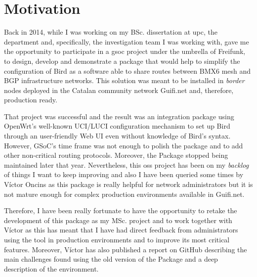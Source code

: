 
\section{Motivation}
\label{sec:motivation}
Back in 2014, while I was working on my BSc. dissertation at \acrfull{upc}, the department and, specifically, the investigation team I was working with, gave me the opportunity to participate in a \Gls{gsoc} project under the umbrella of Freifunk, to design, develop and demonstrate a package that would help to simplify the configuration of Bird as a software able to share routes between BMX6 mesh and BGP infrastructure networks. This solution was meant to be installed in \textit{border} nodes deployed in the Catalan community network Guifi.net and, therefore, production ready.

That project was successful and the result was an integration package using OpenWrt's well-known UCI/LUCI configuration mechanism to set up Bird through an user-friendly Web UI even without knowledge of Bird's syntax. However, GSoC's time frame was not enough to polish the package and to add other non-critical routing protocols. Moreover, the Package stopped being maintained later that year. Nevertheless, this \acrshort{oss} project has been on my \textit{backlog} of things I want to keep improving and also I have been queried some times by Víctor Oncins as this package is really helpful for network administrators but it is not mature enough for complex production environments available in Guifi.net.

Therefore, I have been really fortunate to have the opportunity to retake the development of this package as my MSc. project and to work together with Víctor as this has meant that I have had direct feedback from administrators using the tool in production environments and to improve its most critical features. Moreover, Víctor has also published a report on GitHub \cite{bgpbmx6} describing the main challenges found using the old version of the Package and a deep description of the environment.

